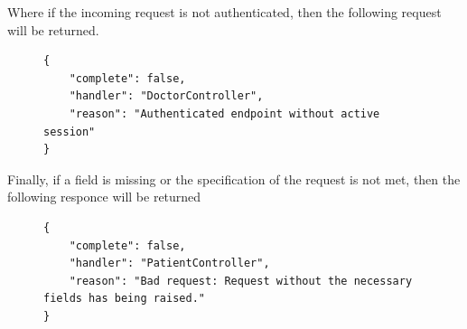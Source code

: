 					Where if the incoming request is not authenticated, then the following request will be returned.
										\begin{figure}[H]
						\iftrue
						\begin{lstlisting}[]
{
	"complete": false,
	"handler": "DoctorController",
	"reason": "Authenticated endpoint without active session"
}
						\end{lstlisting}
					\end{figure}
					Finally, if a field is missing or the specification of the request is not met, then the following responce will be returned
					\begin{figure}[H]
						\iftrue
						\begin{lstlisting}[]
{
	"complete": false,
	"handler": "PatientController",
	"reason": "Bad request: Request without the necessary fields has being raised."
}					
						\end{lstlisting}
					\end{figure}
